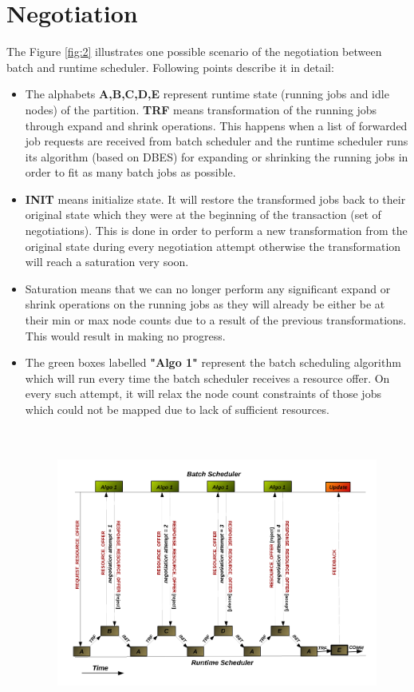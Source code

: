 \section{Negotiation}
The Figure \ref{fig:2} illustrates one possible scenario of the negotiation between batch and runtime scheduler. Following points describe it in detail:
\begin{itemize}
\item The alphabets \textbf{A,B,C,D,E} represent runtime state (running jobs and idle nodes) of the partition. \textbf{TRF} means transformation of the running jobs through expand and shrink operations. This happens when a list of forwarded job requests are received from batch scheduler and the runtime scheduler runs its algorithm (based on DBES) for expanding or shrinking the running jobs in order to fit as many batch jobs as possible.
\item \textbf{INIT} means initialize state. It will restore the transformed jobs back to their original state which they were at the beginning of the transaction (set of negotiations). This is done in order to perform a new transformation from the original state during every negotiation attempt otherwise the transformation will reach a saturation very soon.
\item Saturation means that we can no longer perform any significant expand or shrink operations on the running jobs as they will already be either be at their min or max node counts due to a result of the previous transformations. This would result in making no progress.
\item The green boxes labelled \textbf{"Algo 1"} represent the batch scheduling algorithm which will run every time the batch scheduler receives a resource offer. On every such attempt, it will relax the node count constraints of those jobs which could not be mapped due to lack of sufficient resources.
\begin{figure}[!htbp]
\hspace*{-0.5in}
\includegraphics[width=1.2\textwidth, height=95mm]{./figures/negotiation.pdf}

\end{figure}
\end{itemize}
